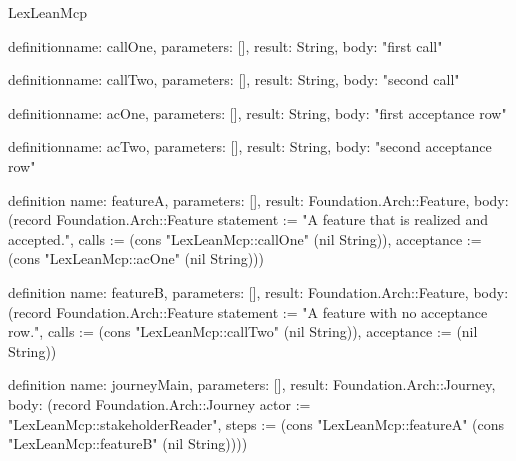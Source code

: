 \begin{lexlean}{LexLeanMcp}
\begin{semanticmodule}
definition{name: callOne, parameters: [], result: String, body: "first call"}

definition{name: callTwo, parameters: [], result: String, body: "second call"}

definition{name: acOne, parameters: [], result: String, body: "first acceptance row"}

definition{name: acTwo, parameters: [], result: String, body: "second acceptance row"}

definition{
  name: featureA,
  parameters: [],
  result: Foundation.Arch::Feature,
  body: (record Foundation.Arch::Feature {statement := "A feature that is realized and accepted.", calls := (cons "LexLeanMcp::callOne" (nil String)), acceptance := (cons "LexLeanMcp::acOne" (nil String))})
}

definition{
  name: featureB,
  parameters: [],
  result: Foundation.Arch::Feature,
  body: (record Foundation.Arch::Feature {statement := "A feature with no acceptance row.", calls := (cons "LexLeanMcp::callTwo" (nil String)), acceptance := (nil String)})
}

definition{
  name: journeyMain,
  parameters: [],
  result: Foundation.Arch::Journey,
  body: (record Foundation.Arch::Journey {actor := "LexLeanMcp::stakeholderReader", steps := (cons "LexLeanMcp::featureA" (cons "LexLeanMcp::featureB" (nil String)))})
}
\end{semanticmodule}
\end{lexlean}
